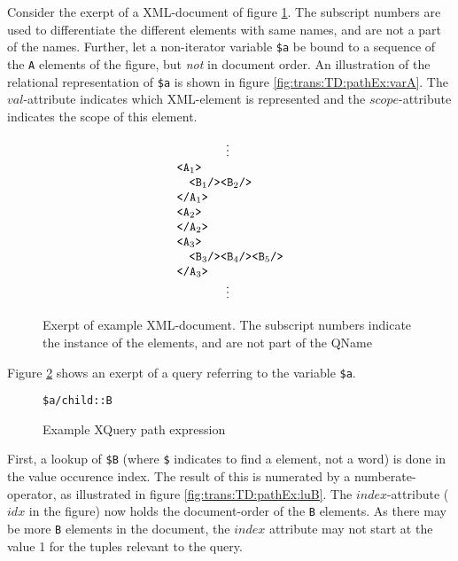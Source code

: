 \begin{myExample}
Consider the exerpt of a XML-document of figure \ref{fig:trans:TD:pathExXml}. The subscript numbers are used to
differentiate the different elements with same names, and are not a part of the names. Further, let a non-iterator
variable \texttt{\$a} be bound to a sequence of the \texttt{A} elements of the figure, but \emph{not} in document order.
An illustration of the relational representation of \texttt{\$a} is shown in figure
\ref{fig:trans:TD:pathEx:varA}. The $val$-attribute indicates which XML-element is represented and the
$scope$-attribute indicates the scope of this element.

\begin{figure}[h]
\centering
\begin{equation*}
\begin{array}{l}
\qquad \qquad \vdots \\
\mbox{\texttt{<A}}_{1}\mbox{\texttt{>}} \\ \quad
\mbox{\texttt{<B}}_{1}\mbox{\texttt{/>}}\mbox{\texttt{<B}}_{2}\mbox{\texttt{/>}} \\
\mbox{\texttt{</A}}_{1}\mbox{\texttt{>}} \\
\mbox{\texttt{<A}}_{2}\mbox{\texttt{>}} \\ 
\mbox{\texttt{</A}}_{2}\mbox{\texttt{>}} \\
\mbox{\texttt{<A}}_{3}\mbox{\texttt{>}} \\ \quad
\mbox{\texttt{<B}}_{3}\mbox{\texttt{/>}}\mbox{\texttt{<B}}_{4}\mbox{\texttt{/>}}\mbox{\texttt{<B}}_{5}\mbox{\texttt{/>}}
\\ \mbox{\texttt{</A}}_{3}\mbox{\texttt{>}} \\
\qquad \qquad \vdots
\end{array}
\end{equation*}
\caption[Exerpt of example XML-document.]{Exerpt of example XML-document. The subscript numbers indicate the
instance of the elements, and are not part of the QName \label{fig:trans:TD:pathExXml}}
\end{figure}

Figure \ref{fig:trans:TD:pathQu} shows an exerpt of a query referring to the variable \texttt{\$a}.
\begin{figure}[!h]
\centering
\texttt{\$a/child::B}
\caption{Example XQuery path expression \label{fig:trans:TD:pathQu}}
\end{figure} 

First, a lookup of \texttt{\$B} (where \texttt{\$} indicates to find a element, not a word) is done in the value
occurence index. The result of this is numerated by a \textsf{numberate}-operator, as illustrated in figure
\ref{fig:trans:TD:pathEx:luB}. The $index$-attribute ($idx$ in the figure) now holds the document-order of the
\texttt{B} elements. As there may be more \texttt{B} elements in the document, the $index$ attribute may not start
at the value 1 for the tuples relevant to the query.


\end{myExample}
